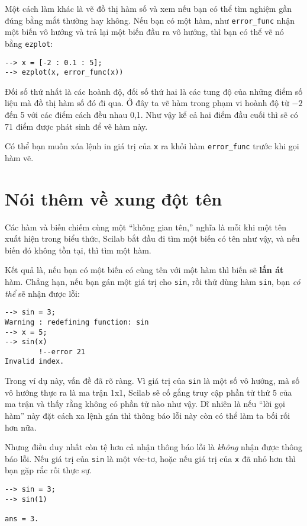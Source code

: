 \documentclass[12pt]{book}
\begin{document}
Một cách làm khác là vẽ đồ thị hàm số và xem nếu bạn có thể
tìm nghiệm gần đúng bằng mắt thường hay không. Nếu bạn có một hàm,
như \verb#error_func# nhận một biến vô hướng và trả lại một
biến đầu ra vô hướng, thì bạn có thể vẽ nó bằng {\tt ezplot}:

\begin{verbatim}
--> x = [-2 : 0.1 : 5];
--> ezplot(x, error_func(x))
\end{verbatim}

Đối số thứ nhất là các hoành độ, đối số thứ hai là các tung độ
của những điểm số liệu mà đồ thị hàm số đó đi qua. 
Ở đây ta vẽ hàm trong phạm vi hoành độ từ $-2$ đến 5 với các
điểm cách đều nhau 0,1. Như vậy kể cả hai điểm đầu cuối thì
sẽ có 71 điểm được phát sinh để vẽ hàm này. 

Có thể bạn muốn xóa lệnh in giá trị của \texttt{x} ra khỏi hàm
\texttt{error\_func} trước khi gọi hàm vẽ.


\section{Nói thêm về xung đột tên}

Các hàm và biến chiếm cùng một ``không gian tên,'' nghĩa là mỗi khi 
một tên xuất hiện trong biểu thức, Scilab bắt đầu đi tìm một biến
có tên như vậy, và nếu biến đó không tồn tại, thì tìm một hàm.

Kết quả là, nếu bạn có một biến có cùng tên với một hàm thì biến sẽ 
{\bf lấn át} hàm. Chẳng hạn, nếu bạn gán một giá trị cho {\tt sin}, 
rồi thử dùng hàm {\tt sin}, bạn {\em có thể} sẽ nhận được lỗi:

\begin{verbatim}
--> sin = 3;
Warning : redefining function: sin 
--> x = 5;
--> sin(x)
        !--error 21 
Invalid index.
\end{verbatim}

Trong ví dụ này, vấn đề đã rõ ràng. Vì giá trị của {\tt sin} là
một số vô hướng, mà số vô hướng thực ra là ma trận 1x1, Scilab sẽ
cố gắng truy cập phần tử thứ 5 của ma trận và thấy rằng không có
phần tử nào như vậy. Dĩ nhiên là nếu ``lời gọi hàm'' này đặt cách xa
lệnh gán thì thông báo lỗi này còn có thể làm ta bối rối hơn nữa.

Nhưng điều duy nhất còn tệ hơn cả nhận thông báo lỗi là {\em không}
nhận được thông báo lỗi. Nếu giá trị của {\tt sin} là một véc-tơ,
hoặc nếu giá trị của {\tt x} đã nhỏ hơn thì bạn gặp rắc rối thực sự.

\begin{verbatim}
--> sin = 3;
--> sin(1)

ans = 3.
\end{verbatim}
\end{document}
